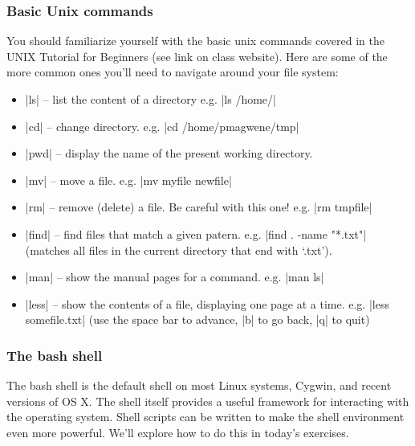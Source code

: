 \documentclass[10pt,letterpaper]{article}
\begin{document}
\subsubsection*{Basic Unix commands}

You should familiarize yourself with the basic unix commands covered in the UNIX Tutorial for Beginners (see link on class website).  Here are some of the more common ones you'll need to navigate around your file system:

\begin{itemize}
\item |ls| -- list the content of a directory e.g. |ls /home/|
\item |cd| -- change directory.  e.g. |cd /home/pmagwene/tmp|
\item |pwd| -- display the name of the present working directory.
\item |mv| -- move a file. e.g. |mv myfile newfile|
\item |rm| -- remove (delete) a file. Be careful with this one! e.g. |rm tmpfile|
\item |find| -- find files that match a given patern. e.g. |find . -name "*.txt"| (matches all files in the current directory that end with `.txt').
\item |man| -- show the manual pages for a command. e.g. |man ls|
\item |less| -- show the contents of a file, displaying one page at a time. e.g. |less somefile.txt| (use the space bar to advance, |b| to go back, |q| to quit)
\end{itemize}


\subsubsection*{The bash shell}

The bash shell is the default shell on most Linux systems, Cygwin, and recent versions of OS X.  The shell itself provides a useful framework for interacting with the operating system. Shell scripts can be written to make the shell environment even more powerful. We'll explore how to do this in today's exercises. 
\end{document}
